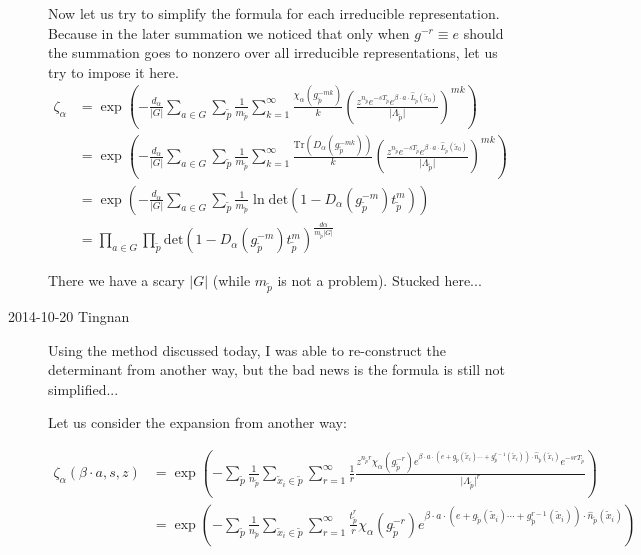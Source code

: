 \begin{description}
Now let us try to simplify the formula for each irreducible representation. Because in the later summation we noticed that only when $g^{-r}\equiv e$ should the summation goes to nonzero over all irreducible representations, let us try to impose it here.
\begin{align*}
\zeta_{\alpha} & =\exp\left(-\frac{d_{\alpha}}{\vert G\vert}\sum_{a\in G}\sum_{\tilde{p}}\frac{1}{m_{\tilde{p}}}\sum_{k=1}^{\infty}\frac{\chi_{\alpha}(g_{\tilde{p}}^{-mk})}{k}\left(\frac{z^{n_{\tilde{p}}}e^{-sT_{\tilde{p}}}e^{\beta\cdot a\cdot\hat{L}_{\tilde{p}}(\tilde{x}_{0})}}{\vert\Lambda_{\tilde{p}}\vert}\right)^{mk}\right)\\
 & =\exp\left(-\frac{d_{\alpha}}{\vert G\vert}\sum_{a\in G}\sum_{\tilde{p}}\frac{1}{m_{\tilde{p}}}\sum_{k=1}^{\infty}\frac{\mathrm{Tr}(D_{\alpha}(g_{\tilde{p}}^{-mk}))}{k}\left(\frac{z^{n_{\tilde{p}}}e^{-sT_{\tilde{p}}}e^{\beta\cdot a\cdot\hat{L}_{\tilde{p}}(\tilde{x}_{0})}}{\vert\Lambda_{\tilde{p}}\vert}\right)^{mk}\right)\\
 & =\exp\left(-\frac{d_{\alpha}}{\vert G\vert}\sum_{a\in G}\sum_{\tilde{p}}\frac{1}{m_{\tilde{p}}}\ln\mathrm{det}\left(1-D_{\alpha}(g_{\tilde{p}}^{-m})t_{\tilde{p}}^{m}\right)\right)\\
 & =\prod_{a\in G}\prod_{\tilde{p}}\mathrm{det}\left(1-D_{\alpha}(g_{\tilde{p}}^{-m})t_{\tilde{p}}^{m}\right)^{\frac{d\alpha}{m_{\tilde{p}}\vert G\vert}}
\end{align*}

There we have a scary $\vert G\vert$ (while $m_{\tilde{p}}$ is not a problem). Stucked here...

\item[2014-10-20 Tingnan]

Using the method discussed today, I was able to re-construct the determinant from another way, but the bad news is the formula is still not simplified...


Let us consider the expansion from another way:

\begin{align*}
\zeta_{\alpha}(\beta\cdot a,s,z) & =\exp\left(-\sum_{\tilde{p}}\frac{1}{n_{\tilde{p}}}\sum_{\tilde{x}_{i}\in\tilde{p}}\sum_{r=1}^{\infty}\frac{1}{r}\frac{z^{n_{\tilde{p}}r}\chi_{\alpha}(g_{\tilde{p}}^{-r})e^{\beta\cdot a\cdot(e+g_{\tilde{p}}(\tilde{x}_{i})\cdots+g_{\tilde{p}}^{r-1}(\tilde{x}_{i}))\cdot\hat{n}_{\tilde{p}}(\tilde{x}_{i})}e^{-srT_{\tilde{p}}}}{\vert\Lambda_{\tilde{p}}\vert^{r}}\right)\\
 & =\exp\left(-\sum_{\tilde{p}}\frac{1}{n_{\tilde{p}}}\sum_{\tilde{x}_{i}\in\tilde{p}}\sum_{r=1}^{\infty}\frac{t_{\tilde{p}}^{r}}{r}\chi_{\alpha}(g_{\tilde{p}}^{-r})e^{\beta\cdot a\cdot(e+g_{\tilde{p}}(\tilde{x}_{i})\cdots+g_{\tilde{p}}^{r-1}(\tilde{x}_{i}))\cdot\hat{n}_{\tilde{p}}(\tilde{x}_{i})}\right)
\end{align*}



\end{description}
